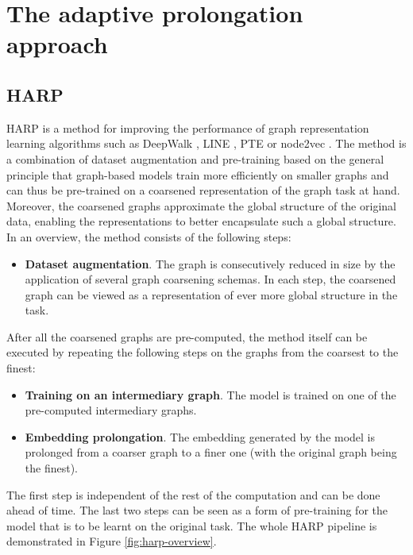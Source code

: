 \section{The adaptive prolongation approach}

\subsection{HARP}
HARP is a method for improving the performance of graph representation learning algorithms such as DeepWalk \cite{perozzi_deepwalk_2014}, LINE \cite{tang_line_2015}, PTE \cite{tang_pte_2015} or node2vec \cite{grover_node2vec_2016}. The method is a combination of dataset augmentation and pre-training based on the general principle that graph-based models train more efficiently on smaller graphs and can thus be pre-trained on a coarsened representation of the graph task at hand. Moreover, the coarsened graphs approximate the global structure of the original data, enabling the representations to better encapsulate such a global structure. In an overview, the method consists of the following steps:

\begin{itemize}
  \item \textbf{Dataset augmentation}. The graph is consecutively reduced in size by the application of several graph coarsening schemas. In each step, the coarsened graph can be viewed as a representation of ever more global structure in the task.
\end{itemize}
After all the coarsened graphs are pre-computed, the method itself can be executed by repeating the following steps on the graphs from the coarsest to the finest:
\begin{itemize}
  \item \textbf{Training on an intermediary graph}. The model is trained on one of the pre-computed intermediary graphs.
  \item \textbf{Embedding prolongation}. The embedding generated by the model is prolonged from a coarser graph to a finer one (with the original graph being the finest).
\end{itemize}

The first step is independent of the rest of the computation and can be done ahead of time. The last two steps can be seen as a form of pre-training for the model that is to be learnt on the original task. The whole HARP pipeline is demonstrated in Figure \ref{fig:harp-overview}.

